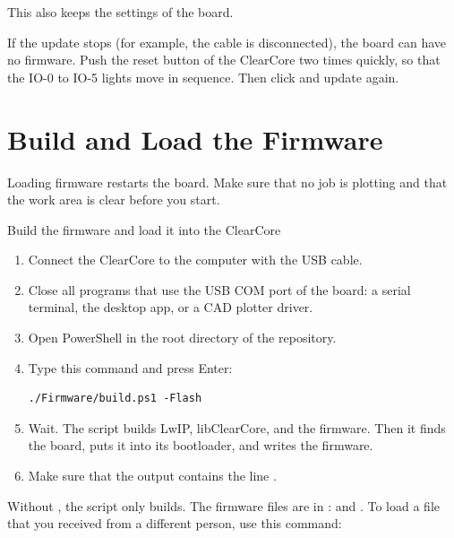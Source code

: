 This also keeps the settings of the board.

\begin{note}
\notelabel If the update stops (for example, the cable is disconnected), the
board can have no firmware. Push the reset button of the ClearCore two times
quickly, so that the IO-0 to IO-5 lights move in sequence. Then click
 and update again.
\end{note}

\section{Build and Load the Firmware}\label{sec:fw-build}

\begin{warning}
Loading firmware restarts the board. Make sure that no job is plotting and
that the work area is clear before you start.
\end{warning}

\begin{procedure}{Build the firmware and load it into the ClearCore}
\begin{enumerate}
  \item Connect the ClearCore to the computer with the USB cable.
  \item Close all programs that use the USB COM port of the board: a serial
        terminal, the desktop app, or a CAD plotter driver.
  \item Open PowerShell in the root directory of the repository.
  \item Type this command and press Enter:
\begin{lstlisting}[language=console]
./Firmware/build.ps1 -Flash
\end{lstlisting}
  \item Wait. The script builds LwIP, libClearCore, and the firmware. Then it
        finds the board, puts it into its bootloader, and writes the
        firmware.
  \item Make sure that the output contains the line .
\end{enumerate}
\end{procedure}

Without , the script only builds. The firmware files are in
:  and
. To load a  file that you received
from a different person, use this command:


